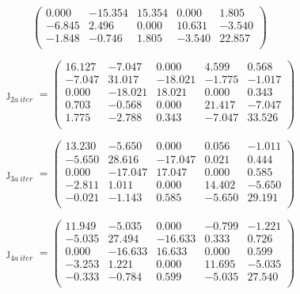 \documentclass[a4paper,10pt,titlepage,oneside]{article}
\begin{document}
{\begin{equation*}
\begin{pmatrix}
         0.000  & -15.354  &  15.354  &   0.000  &   1.805\\
        
        -6.845    & 2.496   &  0.000 &   10.631  &  -3.540\\
        
        -1.848    &-0.746  &   1.805  &  -3.540  &  22.857\\
    \end{pmatrix}
\end{equation*}

\begin{equation*}
\jmath_{2a\:iter}=
    \begin{pmatrix} 
    16.127  &  -7.047  &   0.000    & 4.599   &  0.568\\
    -7.047  &  31.017 &  -18.021  &    -1.775 &   -1.017\\
    0.000  & -18.021  &  18.021   &  0.000  &   0.343\\
    0.703  &  -0.568  &   0.000   & 21.417  &  -7.047\\
    1.775  &  -2.788 &     0.343  &  -7.047 &   33.526\\
    \end{pmatrix}
\end{equation*}

\begin{equation*}
\jmath_{3a\:iter}=
    \begin{pmatrix} 
    13.230 &   -5.650  &   0.000  &     0.056 &   -1.011\\
    -5.650  &  28.616 &  -17.047  &   0.021   &  0.444\\
    0.000   &-17.047 &    17.047  &   0.000   &  0.585\\
    -2.811  &   1.011  &   0.000  &    14.402 &   -5.650\\
    -0.021  &  -1.143 &    0.585  &  -5.650 &   29.191\\
    \end{pmatrix}
\end{equation*}

\begin{equation*}
\jmath_{4a\:iter}=
    \begin{pmatrix} 
    11.949  &  -5.035  &   0.000  &    -0.799  &  -1.221\\
    -5.035  &  27.494 &  -16.633  &   0.333 &    0.726\\
    0.000  & -16.633&    16.633   &  0.000  &   0.599\\
    -3.253  &   1.221  &   0.000  &  11.695 &   -5.035\\
    -0.333   & -0.784  &   0.599  &  -5.035 &   27.540\\
    \end{pmatrix}
\end{equation*}

}
\end{document}
